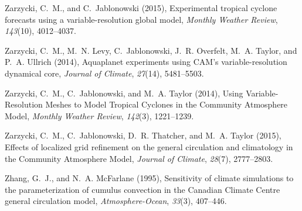 \documentclass[ms,draft]{agutex}   %
\begin{document}
\begin{article}
\begin{thebibliography}{84}
Zarzycki, C.~M., and C.~Jablonowski (2015), {Experimental tropical cyclone
  forecasts using a variable-resolution global model}, \textit{Monthly Weather
  Review}, \textit{143}(10), 4012--4037.

Zarzycki, C.~M., M.~N. Levy, C.~Jablonowski, J.~R. Overfelt, M.~A. Taylor, and
  P.~A. Ullrich (2014{}), {Aquaplanet experiments using CAM's
  variable-resolution dynamical core}, \textit{Journal of Climate},
  \textit{27}(14), 5481--5503.

Zarzycki, C.~M., C.~Jablonowski, and M.~A. Taylor (2014{}), {Using
  Variable-Resolution Meshes to Model Tropical Cyclones in the Community
  Atmosphere Model}, \textit{Monthly Weather Review}, \textit{142}(3),
  1221--1239.

Zarzycki, C.~M., C.~Jablonowski, D.~R. Thatcher, and M.~A. Taylor (2015),
  {Effects of localized grid refinement on the general circulation and
  climatology in the Community Atmosphere Model}, \textit{Journal of Climate},
  \textit{28}(7), 2777--2803.

Zhang, G.~J., and N.~A. McFarlane (1995), {Sensitivity of climate simulations
  to the parameterization of cumulus convection in the Canadian Climate Centre
  general circulation model}, \textit{Atmosphere-Ocean}, \textit{33}(3),
  407--446.

\end{thebibliography}



\end{article}


\clearpage
\end{document}
